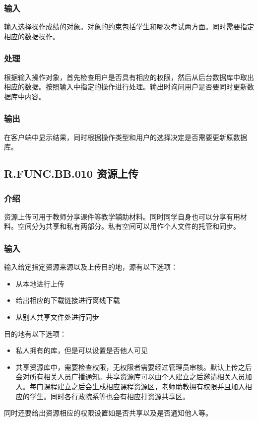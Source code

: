 \begin{enumerate}
    \subsubsection{输入}
    输入选择操作成绩的对象。对象的约束包括学生和哪次考试两方面。同时需要指定相应的数据操作。
    \subsubsection{处理}
    根据输入操作对象，首先检查用户是否具有相应的权限，然后从后台数据库中取出相应的数据。按照输入中指定的操作进行处理。输出时询问用户是否要同时更新数据库中内容。
    \subsubsection{输出}
    在客户端中显示结果，同时根据操作类型和用户的选择决定是否需要更新原数据库。

  \subsection{R.FUNC.BB.010 资源上传}
    \subsubsection{介绍}
    资源上传可用于教师分享课件等教学辅助材料。同时同学自身也可以分享有用材料。空间分为共享和私有两部分。私有空间可以用作个人文件的托管和同步。
    \subsubsection{输入}
    输入给定指定资源来源以及上传目的地，源有以下选项：
    \begin{itemize}
      \item 从本地进行上传
      \item 给出相应的下载链接进行离线下载
      \item 从别人共享文件处进行同步
    \end{itemize}
    目的地有以下选项：
    \begin{itemize}
      \item 私人拥有的库，但是可以设置是否他人可见
      \item 共享资源库中，需要检查权限，无权限者需要经过管理员审核。默认上传之后会对所有相关人员广播通知。共享资源库可以由个人建立之后邀请相关人员加入。每门课程建立之后会生成相应课程资源区，老师助教拥有权限并且加入相应的学生。同时各行政院系等也会有相应打资源共享区。
    \end{itemize}
    同时还要给出资源相应的权限设置如是否共享以及是否通知他人等。

\end{enumerate}
